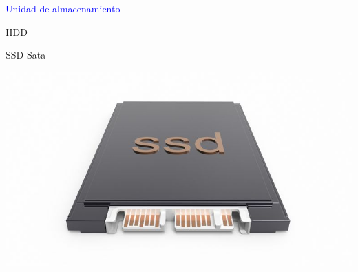 \documentclass[10pt,xcolor={dvipsnames}]{beamer}
\begin{document}
\begin{frame}
\begin{center}
\Huge{\textcolor{blue}{Unidad de almacenamiento}}
\end{center}
\end{frame}

\begin{frame}{HDD}
\begin{center}
\end{center}
\end{frame}

\begin{frame}{SSD Sata}
\begin{center}
\includegraphics[scale=0.4]{Figures/ssdsata}
\end{center}
\end{frame}
\end{document}
